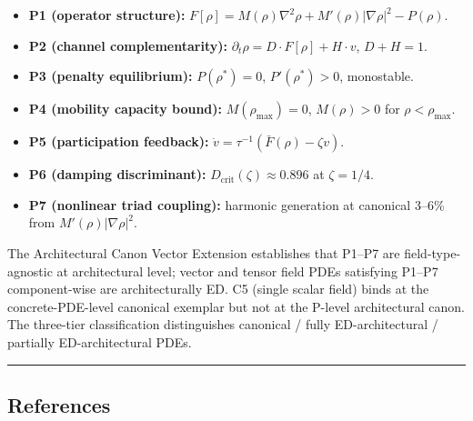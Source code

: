 \documentclass[
  11pt,a4paper]{article}
\providecommand{\tightlist}{%
  \setlength{\itemsep}{0pt}\setlength{\parskip}{0pt}}
\begin{document}
\begin{itemize}
\tightlist
\item
  \textbf{P1 (operator structure):}
  \(F[\rho] = M(\rho)\nabla^2\rho + M'(\rho)|\nabla\rho|^2 - P(\rho)\).
\item
  \textbf{P2 (channel complementarity):}
  \(\partial_t \rho = D \cdot F[\rho] + H \cdot v\), \(D + H = 1\).
\item
  \textbf{P3 (penalty equilibrium):} \(P(\rho^*) = 0\),
  \(P'(\rho^*) > 0\), monostable.
\item
  \textbf{P4 (mobility capacity bound):} \(M(\rho_\mathrm{max}) = 0\),
  \(M(\rho) > 0\) for \(\rho < \rho_\mathrm{max}\).
\item
  \textbf{P5 (participation feedback):}
  \(\dot v = \tau^{-1}(\bar F(\rho) - \zeta v)\).
\item
  \textbf{P6 (damping discriminant):}
  \(D_\mathrm{crit}(\zeta) \approx 0.896\) at \(\zeta = 1/4\).
\item
  \textbf{P7 (nonlinear triad coupling):} harmonic generation at
  canonical 3--6\% from \(M'(\rho)|\nabla\rho|^2\).
\end{itemize}

The Architectural Canon Vector Extension establishes that P1--P7 are
field-type-agnostic at architectural level; vector and tensor field PDEs
satisfying P1--P7 component-wise are architecturally ED. C5 (single
scalar field) binds at the concrete-PDE-level canonical exemplar but not
at the P-level architectural canon. The three-tier classification
distinguishes canonical / fully ED-architectural / partially
ED-architectural PDEs.

\begin{center}\rule{0.5\linewidth}{0.5pt}\end{center}

\subsection{References}\label{references}
\end{document}
